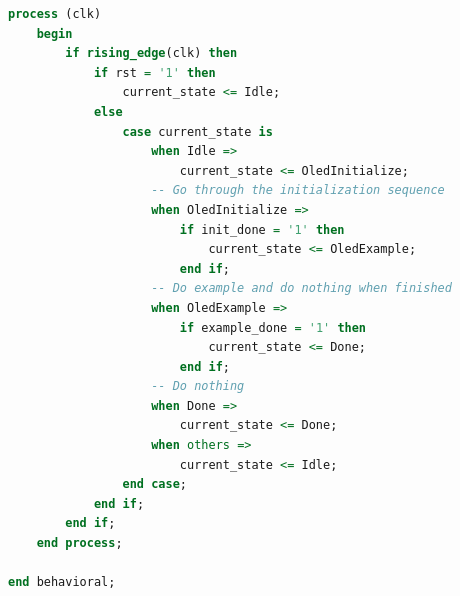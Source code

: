 \documentclass[a4paper,12pt]{article}
\begin{document}
\begin{lstlisting}[language=VHDL, caption={\texttt{oled\_ctrl.vhd}: top que inicializa la OLED y enruta los switches \texttt{a,b} hacia \texttt{oled\_ex}.}]
    process (clk)
    begin
        if rising_edge(clk) then
            if rst = '1' then
                current_state <= Idle;
            else
                case current_state is
                    when Idle =>
                        current_state <= OledInitialize;
                    -- Go through the initialization sequence
                    when OledInitialize =>
                        if init_done = '1' then
                            current_state <= OledExample;
                        end if;
                    -- Do example and do nothing when finished
                    when OledExample =>
                        if example_done = '1' then
                            current_state <= Done;
                        end if;
                    -- Do nothing
                    when Done =>
                        current_state <= Done;
                    when others =>
                        current_state <= Idle;
                end case;
            end if;
        end if;
    end process;

end behavioral;
\end{lstlisting}
\end{document}
